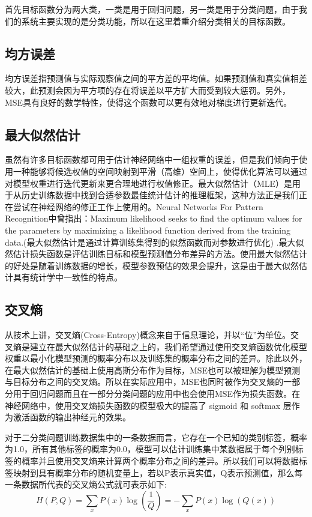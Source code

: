 首先目标函数分为两大类，一类是用于回归问题，另一类是用于分类问题，由于我们的系统主要实现的是分类功能，所以在这里着重介绍分类相关的目标函数。

\subsection{均方误差}

均方误差指预测值与实际观察值之间的平方差的平均值。如果预测值和真实值相差较大，此预测会因为平方项的存在将误差以平方扩大而受到较大惩罚。另外，MSE具有良好的数学特性，使得这个函数可以更有效地对梯度进行更新迭代。

\subsection{最大似然估计}

虽然有许多目标函数都可用于估计神经网络中一组权重的误差，但是我们倾向于使用一种能够将候选权值的空间映射到平滑（高维）空间上，使得优化算法可以通过对模型权重进行迭代更新来更合理地进行权值修正。最大似然估计（MLE）是用于从历史训练数据中找到合适参数最佳统计估计的推理框架，这种方法正是我们正在尝试在神经网络的修正工作上使用的。Neural Networks For Pattern Recognition中曾指出：Maximum likelihood seeks to find the optimum values for the parameters by maximizing a likelihood function derived from the training data.(最大似然估计是通过计算训练集得到的似然函数而对参数进行优化) \cite{NeuralNetworkforPatternRecognize}.最大似然估计损失函数是评估训练目标和模型预测值分布差异的方法。使用最大似然估计的好处是随着训练数据的增长，模型参数预估的效果会提升，这是由于最大似然估计具有统计学中一致性的特点\cite{DeepLearning2016}。

\subsection{交叉熵}

从技术上讲，交叉熵(Cross-Entropy)概念来自于信息理论，并以“位”为单位。交叉熵是建立在最大似然估计的基础之上的，我们希望通过使用交叉熵函数优化模型权重以最小化模型预测的概率分布以及训练集的概率分布之间的差异。除此以外，在最大似然估计的基础上使用高斯分布作为目标，MSE也可以被理解为模型预测与目标分布之间的交叉熵。所以在实际应用中，MSE也同时被作为交叉熵的一部分用于回归问题而且在一部分分类问题的应用中也会使用MSE作为损失函数。在神经网络中，使用交叉熵损失函数的模型极大的提高了 sigmoid 和 softmax 层作为激活函数的输出神经元的效果。

对于二分类问题训练数据集中的一条数据而言，它存在一个已知的类别标签，概率为1.0，所有其他标签的概率为0.0，模型可以估计训练集中某数据属于每个列别标签的概率并且使用交叉熵来计算两个概率分布之间的差异。所以我们可以将数据标签映射到具有概率分布的随机变量上，若以P表示真实值，Q表示预测值，那么每一条数据所代表的交叉熵公式就可表示如下:
\begin{equation}
  H(P, Q) = \sum_{x} P(x)\log(\frac{1}{Q}) = -\sum_{x} P(x)\log(Q(x))
\end{equation}

